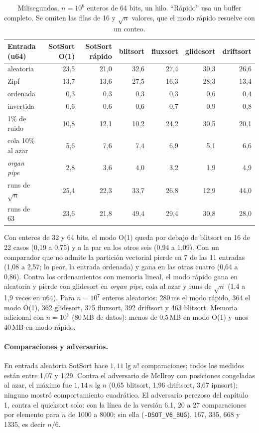 \documentclass[10pt,a4paper]{article}
\begin{document}
\begin{table}[h]\centering\small
\begin{tabular}{lrrrrrr}
\toprule
Entrada (u64) & SotSort O(1) & SotSort rápido & blitsort & fluxsort & glidesort & driftsort\\
\midrule
aleatoria & 23,5 & 21,0 & 32,6 & 27,4 & 30,3 & 26,6\\
Zipf & 13,7 & 13,6 & 27,5 & 16,3 & 28,3 & 13,4\\
ordenada & 0,3 & 0,3 & 0,3 & 0,3 & 0,6 & 0,4\\
invertida & 0,6 & 0,6 & 0,6 & 0,7 & 0,9 & 0,8\\
1\% de ruido & 10,8 & 12,1 & 10,2 & 24,2 & 30,5 & 20,1\\
cola 10\% al azar & 5,6 & 7,6 & 7,4 & 6,9 & 5,1 & 6,6\\
\emph{organ pipe} & 2,8 & 3,6 & 4,0 & 3,2 & 1,9 & 4,9\\
runs de $\sqrt n$ & 25,4 & 22,3 & 33,7 & 26,8 & 12,9 & 44,0\\
runs de 63 & 23,6 & 21,8 & 49,4 & 29,4 & 30,8 & 28,0\\
\bottomrule
\end{tabular}
\caption{Milisegundos, $n=10^6$ enteros de 64 bits, un hilo. ``Rápido'' usa un buffer
completo. Se omiten las filas de 16 y $\sqrt n$ valores, que el modo rápido resuelve con
un conteo.}\label{tab:abs}
\end{table}

\noindent Con enteros de 32 y 64 bits, el modo O(1) queda por debajo de blitsort en 16
de 22 casos (0,19 a 0,75) y a la par en los otros seis (0,94 a 1,09). Con un comparador
que no admite la partición vectorial pierde en 7 de las 11 entradas (1,08 a 2,57; lo
peor, la entrada ordenada) y gana en las otras cuatro (0,64 a 0,86). Contra los ordenamientos con memoria
lineal, el modo rápido gana en aleatoria y pierde con glidesort en \emph{organ pipe},
cola al azar y runs de $\sqrt n$ (1,4 a 1,9 veces en u64). Para $n=10^7$ enteros
aleatorios: 280\,ms el modo rápido, 364 el modo O(1), 362 glidesort, 375 fluxsort, 392
driftsort y 463 blitsort. Memoria adicional con $n=10^7$ (80\,MB de datos): menos de
0,5\,MB en modo O(1) y unos 40\,MB en modo rápido.

\paragraph{Comparaciones y adversarios.} En entrada aleatoria SotSort hace
$1{,}11\lg n!$ comparaciones; todos los medidos están entre 1,07 y 1,29. Contra el
adversario de McIlroy con posiciones congeladas al azar, el máximo fue $1{,}14\,n\lg n$
(0,65 blitsort, 1,96 driftsort, 3,67 ipnsort); ninguno mostró comportamiento
cuadrático. El adversario perezoso del capítulo 1, contra el quicksort solo: con la
línea de la versión 6.1, 20 a 27 comparaciones por elemento para $n$ de 1000 a 8000;
sin ella (\texttt{-DSOT\_V6\_BUG}), 167, 335, 668 y 1335, es decir $n/6$.
\end{document}

